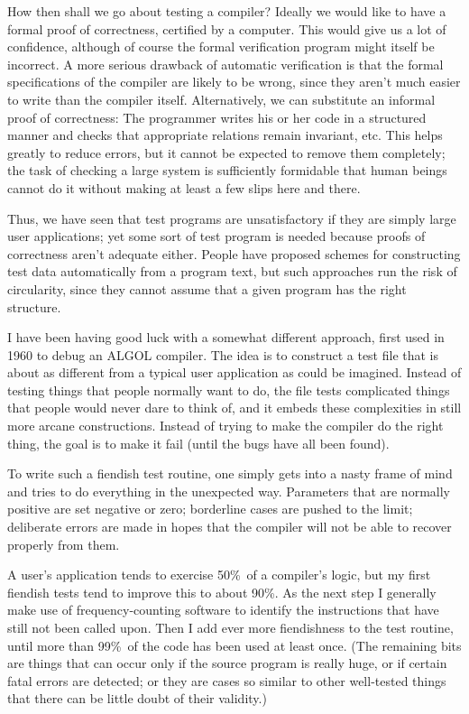 How then shall we go about testing a compiler? Ideally we would like to
have a formal proof of correctness, certified by a computer.
This would give us a lot of confidence,
although of course the formal verification program might itself be incorrect.
A more serious drawback of automatic verification is that the formal
specifications of the compiler are likely to be wrong, since they aren't
much easier to write than the compiler itself. Alternatively, we can
substitute an informal proof of correctness: The programmer writes his or
her code in a structured manner and checks that appropriate relations
remain invariant, etc. This helps greatly to reduce errors, but it cannot
be expected to remove them completely; the task of checking a large
system is sufficiently formidable that human beings cannot do it without
making at least a few slips here and there.

Thus, we have seen that test programs are unsatisfactory if they are simply
large user applications; yet some sort of test program is needed because
proofs of correctness aren't adequate either. People have proposed schemes
for constructing test data automatically from a program text, but such
approaches run the risk of circularity, since they cannot assume that a
given program has the right structure.

I have been having good luck with a somewhat different approach,
first used in 1960 to debug an {\mc ALGOL} compiler. The idea is to
construct a test file that is about as different from a typical user
application as could be imagined. Instead of testing things that people
normally want to do, the file tests complicated things that people would
never dare to think of, and it embeds these complexities in still
more arcane constructions. Instead of trying to make the compiler do the
right thing, the goal is to make it fail (until the bugs have all been found).

To write such a fiendish test routine, one simply gets into a nasty frame
of mind and tries to do everything in the unexpected way. Parameters
that are normally positive are set negative or zero; borderline cases
are pushed to the limit; deliberate errors are made in hopes that the
compiler will not be able to recover properly from them.

A user's application tends to exercise 50\%\ of a compiler's logic,
but my first fiendish tests tend to improve this to about 90\%. As the
next step I generally make use of frequency-counting software to identify
the instructions that have still not been called upon. Then I add ever more
fiendishness to the test routine, until more than 99\%\ of the code
has been used at least once. (The remaining bits are things that
can occur only if the source program is really huge, or if certain
fatal errors are detected; or they are cases so similar to other well-tested
things that there can be little doubt of their validity.)

